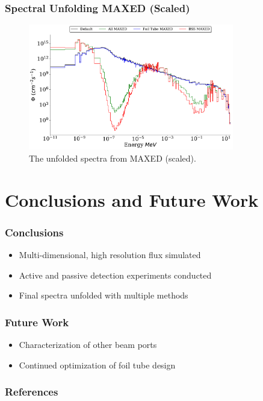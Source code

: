 \documentclass[fleqn]{beamer}
\begin{document}
\begin{frame}
\frametitle{Spectral Unfolding MAXED (Scaled)}

\begin{figure}
\centering
\includegraphics[width = 0.8\textwidth]{unfolded_mx_sc}
\caption{The unfolded spectra from MAXED (scaled).}
\end{figure}

\end{frame}

\section{Conclusions and Future Work}
\begin{frame}
\frametitle{Conclusions}
\begin{itemize}
\item Multi-dimensional, high resolution flux simulated
\item Active and passive detection experiments conducted
\item Final spectra unfolded with multiple methods
\end{itemize}

\end{frame}

\begin{frame}
\frametitle{Future Work}
\begin{itemize}
\item Characterization of other beam ports
\item Continued optimization of foil tube design
\end{itemize}
\end{frame}

\begin{frame}[t,allowframebreaks]\label{lastframe}
\frametitle{References}

{\scriptsize
}
\end{frame}
\end{document}
